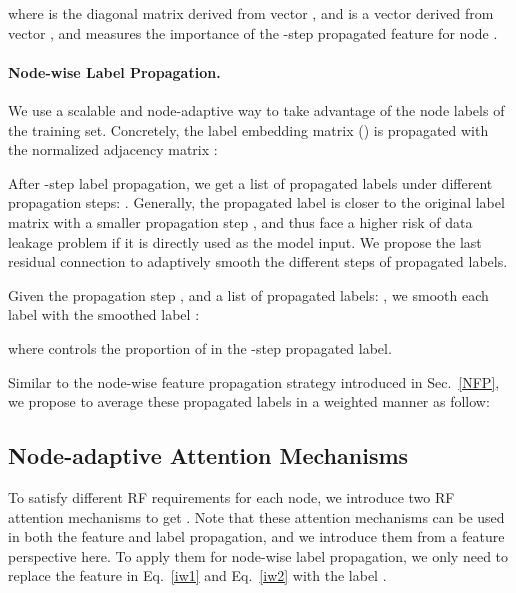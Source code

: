 \documentclass[sigconf]{acmart}
\begin{document}
where  is the diagonal matrix derived from vector , and  is a vector derived from vector , and  measures the importance of the -step propagated feature for node .

\noindent\paragraph{\textbf{Node-wise Label Propagation.}} We use a scalable and node-adaptive way to take advantage of the node labels of the training set. 
Concretely, the label embedding matrix  () is propagated with the normalized adjacency matrix :
\begin{small}

\end{small}

After -step label propagation, we get a list of propagated labels under different propagation steps: .
Generally, the propagated label  is closer to the original label matrix  with a smaller propagation step , and thus face a higher risk of data leakage problem if it is directly used as the model input. We propose the last residual connection to adaptively smooth the different steps of propagated labels.
\begin{definition}
\label{df1}
Given the propagation step , and a list of propagated labels: , we smooth each label  with the smoothed label :

where  controls the proportion of  in the -step propagated label.
\end{definition}

Similar to the node-wise feature propagation strategy  introduced in Sec.~\ref{NFP}, we propose to average these propagated labels in a weighted manner as follow:









\subsection{Node-adaptive Attention Mechanisms}
To satisfy different RF requirements for each node, we introduce two RF attention mechanisms to get .
Note that these attention mechanisms can be used in both the feature and label propagation, and we introduce them from a feature perspective here.
To apply them for node-wise label propagation, we only need to replace the feature  in Eq.~\ref{iw1} and Eq.~\ref{iw2} with the label .
\label{RFA}
\end{document}
